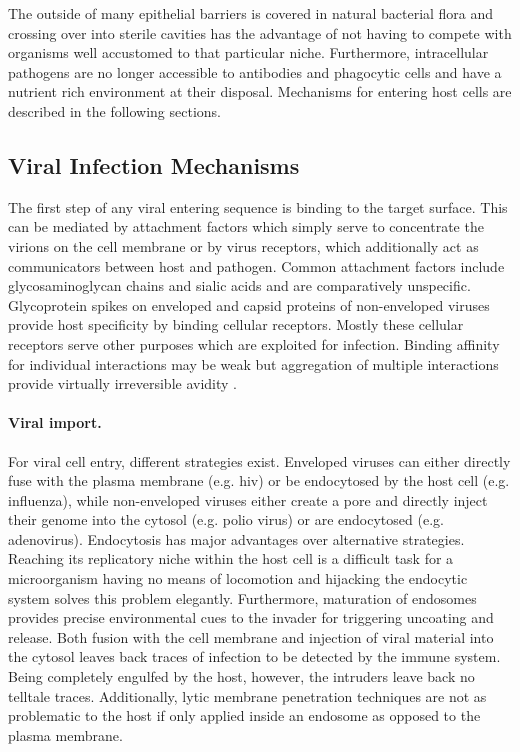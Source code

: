 The outside of many epithelial barriers is covered in natural bacterial flora and crossing over into sterile cavities has the advantage of not having to compete with organisms well accustomed to that particular niche. Furthermore, intracellular pathogens are no longer accessible to antibodies and phagocytic cells and have a nutrient rich environment at their disposal. Mechanisms for entering host cells are described in the following sections.

\subsection{Viral Infection Mechanisms}

The first step of any viral entering sequence is binding to the target surface. This can be mediated by attachment factors which simply serve to concentrate the virions on the cell membrane or by virus receptors, which additionally act as communicators between host and pathogen. Common attachment factors include glycosaminoglycan chains and sialic acids and are comparatively unspecific. Glycoprotein spikes on enveloped and capsid proteins of non-enveloped viruses provide host specificity by binding cellular receptors. Mostly these cellular receptors serve other purposes which are exploited for infection. Binding affinity for individual interactions may be weak but aggregation of multiple interactions provide virtually irreversible avidity \citep{Smith2012}.

\paragraph{Viral import.}
For viral cell entry, different strategies exist. Enveloped viruses can either directly fuse with the plasma membrane (e.g. \gls{hiv}) or be endocytosed by the host cell (e.g. influenza), while non-enveloped viruses either create a pore and directly inject their genome into the cytosol (e.g. polio virus) or are endocytosed (e.g. adenovirus). Endocytosis has major advantages over alternative strategies. Reaching its replicatory niche within the host cell is a difficult task for a microorganism having no means of locomotion and hijacking the endocytic system solves this problem elegantly. Furthermore, maturation of endosomes provides precise environmental cues to the invader for triggering uncoating and release. Both fusion with the cell membrane and injection of viral material into the cytosol leaves back traces of infection to be detected by the immune system. Being completely engulfed by the host, however, the intruders leave back no telltale traces. Additionally, lytic membrane penetration techniques are not as problematic to the host if only applied inside an endosome as opposed to the plasma membrane.

